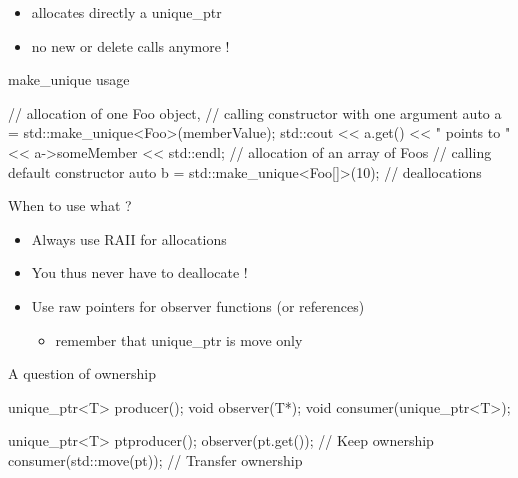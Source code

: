 \begin{frame}[fragile]
  \begin{block}{}
    \begin{itemize}
    \item allocates directly a unique\_ptr
    \item no new or delete calls anymore !
    \end{itemize}
  \end{block}
  \pause
  \begin{exampleblock}{make\_unique usage}
    \begin{cppcode*}{}
      // allocation of one Foo object,
      // calling constructor with one argument
      auto a = std::make_unique<Foo>(memberValue);
      std::cout << a.get() << " points to "
                << a->someMember << std::endl;
      // allocation of an array of Foos
      // calling default constructor
      auto b = std::make_unique<Foo[]>(10);
      // deallocations
    \end{cppcode*}
  \end{exampleblock}
\end{frame}

\begin{frame}[fragile]
  \begin{block}{When to use what ?}
    \begin{itemize}
    \item Always use RAII for allocations
    \item You thus never have to deallocate !
    \item Use raw pointers for observer functions (or references)
      \begin{itemize}
      \item remember that unique\_ptr is move only
      \end{itemize}
    \end{itemize}
  \end{block}
  \pause
  \begin{exampleblock}{A question of ownership}
    \begin{cppcode*}{}
      unique_ptr<T> producer();
      void observer(T*);
      void consumer(unique_ptr<T>);

      unique_ptr<T> pt{producer()};
      observer(pt.get());       // Keep ownership
      consumer(std::move(pt));  // Transfer ownership
    \end{cppcode*}
  \end{exampleblock}
\end{frame}

